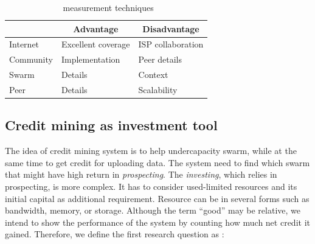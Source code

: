 
\begin{table}[ht]
	\centering
	\caption{\bt~measurement techniques \cite{2010:btworld:wojciechowski}}
	\label{tbl:btmeasuremethod}
	\begin{tabular}{|l|l|l|}
		\hline
		\rowcolor[HTML]{C0C0C0} 
		\multicolumn{1}{|c|}{\cellcolor[HTML]{C0C0C0}\textbf{Level}} & \multicolumn{1}{c|}{\cellcolor[HTML]{C0C0C0}\textbf{Advantage}} & \multicolumn{1}{c|}{\cellcolor[HTML]{C0C0C0}\textbf{Disadvantage}} \\ \hline
		Internet & Excellent coverage & ISP collaboration \\ \hline
		Community & Implementation & Peer details \\ \hline
		Swarm & Details & Context \\ \hline
		Peer & Details & Scalability \\ \hline
	\end{tabular}
\end{table}

\subsection{Credit mining as investment tool}

The idea of credit mining system is to help undercapacity swarm, while at the same time to get credit for uploading data. The system need to find which swarm that might have high return in \textit{prospecting}. The \textit{investing}, which relies in prospecting, is more complex. It has to consider used-limited resources and its initial capital as additional requirement. Resource can be in several forms such as bandwidth, memory, or storage. Although the term ``good'' may be relative, we intend to show the performance of the system by counting how much net credit it gained. Therefore, we define the first research question as :

	
